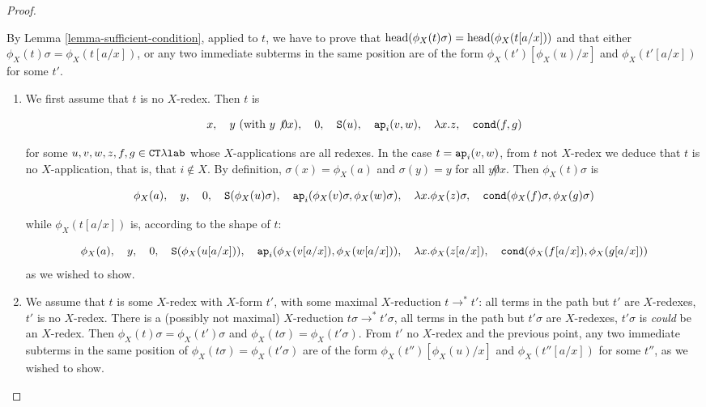\begin{proof}
\begin{enumerate}
By Lemma \ref{lemma-sufficient-condition}, applied to $t$, we have to prove that
${\rm head}( \phi_{X}(t)\sigma ) = {\rm head}( \phi_{X}(t[a/x]) )$ 
and that either $\phi_{X}(t)\sigma= \phi_{X}(t[a/x])$, or any two immediate subterms
in the same position are of the form $\phi_{X}(t')[\phi_{X}(u)/x]$ and $\phi_{X}(t'[a/x])$ for some $t'$.

\begin{enumerate}
\item
We first assume that $t$ is no $X$-redex. Then $t$ is

$$ 
x, \ \ \ 
y \   (\mbox{with $y\not 0 x$}), \ \ \  
0, \ \ \  
\Succ(u),  \ \ \  
\ap_i(v,w), \ \ \  
\lambda x.z, \ \ \  
\cond(f,g)
$$

for some $u,v,w,z,f,g \in { { {\tt CT}\lambda} \mbox{\tt lab}}$ whose $X$-applications are all redexes.
In the case $t = {\tt ap}_i(v,w)$, from $t$ not $X$-redex we deduce that $t$ is no
$X$-application, that is, that $i \not \in X$. By definition, $\sigma(x)=\phi_{X}(a)$
and $\sigma(y)=y$ for all  $y\not 0 x$.
Then $\phi_{X}(t)\sigma$ is

$$ 
\phi_{X}(a), \ \ \ 
y, \ \ \  
0, \ \ \  
\Succ(\phi_X(u)\sigma),  \ \ \  
\ap_i(\phi_X(v)\sigma, \phi_X(w)\sigma), \ \ \  
\lambda x.\phi_X(z)\sigma, \ \ \  
\cond(\phi_X(f)\sigma, \phi_X(g)\sigma)
$$

while $\phi_{X}(t[a/x])$ is, according to the shape of $t$:

$$ 
\phi_{X}(a),   \ \ \ 
y,   \ \ \  
0,   \ \ \  
\Succ(\phi_{X}(u[a/x])),    \ \ \  
\ap_i(   \phi_{X}(v[a/x]),    \phi_{X}(w[a/x])   ), \ \ \  
\lambda x.\phi_{X}(z[a/x]),    \ \ \  
\cond(    \phi_{X}(f[a/x]),     \phi_{X}(g[a/x])    )
$$
as we wished to show.

\item
We assume that $t$ is some $X$-redex with $X$-form $t'$, with some maximal $X$-reduction
$t \rightarrow^* t'$: all terms in the path but $t'$ are $X$-redexes, $t'$ is no $X$-redex. 
There is a (possibly not maximal) $X$-reduction $t\sigma \rightarrow^* t'\sigma$, 
all terms in the path but $t'\sigma$ are $X$-redexes, $t'\sigma$ is \emph{could} be an $X$-redex. 
Then $\phi_X(t)\sigma = \phi_X(t')\sigma$ 
and $\phi_X(t\sigma) = \phi_X(t'\sigma)$.
From $t'$ no $X$-redex and the previous point, any two immediate subterms
in the same position of $\phi_X(t\sigma) = \phi_X(t'\sigma)$
are of the form $\phi_{X}(t'')[\phi_{X}(u)/x]$ and $\phi_{X}(t''[a/x])$ for some $t''$,
as we wished to show.

\end{enumerate}


\end{enumerate}
\end{proof}
